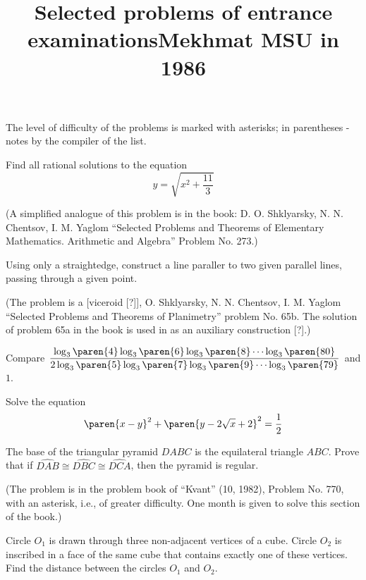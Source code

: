 \documentclass{article}
\title{\texorpdfstring{Selected problems of entrance examinations\newline Mekhmat MSU in 1986}
                      {Selected problems of entrance examinations, Mekhmat MSU in 1986}}
\author{}
\date{}
\begin{document}
\maketitle

\vspace{-0.4cm}
The level of difficulty of the problems is marked with asterisks; in parentheses - notes by the compiler of the list.
\vspace{0.5cm}


\problem  %
Find all rational solutions to the equation
\begin{equation*}
  y = \sqrt{x^2 + \frac{11}{3}}
\end{equation*}

(A simplified analogue of this problem is in the book:
D. O. Shklyarsky, N. N. Chentsov, I. M. Yaglom
``Selected Problems and Theorems of Elementary Mathematics. Arithmetic and Algebra''
Problem No. 273.)


\problem  %
Using only a straightedge, construct a line paraller to two given parallel lines, passing through a given point.

(The problem is a [viceroid [?]], O. Shklyarsky, N. N. Chentsov, I. M. Yaglom
``Selected Problems and Theorems of Planimetry'' problem No. 65b.
The solution of problem 65a in the book is used in as an auxiliary construction [?].)


\problem[{**}]  %
Compare
$\mspace{1.5mu}
 \dfrac{\log_3\paren{4} \log_3\paren{6} \log_3\paren{8} \cdots \log_3\paren{80}}
       {2 \log_3\paren{5} \log_3\paren{7} \log_3\paren{9} \cdots \log_3\paren{79}}
\mspace{1.5mu}$
and $1$.


\problem  %
Solve the equation
\begin{equation*}
  \paren{x - y}^2 + \paren{y - 2 \sqrt{x} + 2}^2 = \frac{1}{2}
\end{equation*}


\problem[{**}]  %
The base of the triangular pyramid $DABC$ is the equilateral triangle $ABC$.
Prove that if $\widehat{DAB} \cong \widehat{DBC} \cong \widehat{DCA}$,
then the pyramid is regular.

(The problem is in the problem book of ``Kvant'' (10, 1982), Problem No. 770, with an asterisk, i.e., of greater difficulty.
One month is given to solve this section of the book.)


\problem[{*}]  %
Circle $O_1$ is drawn through three non-adjacent vertices of a cube.
Circle $O_2$ is inscribed in a face of the same cube that contains exactly one of these vertices.
Find the distance between the circles $O_1$ and $O_2$.
\end{document}
